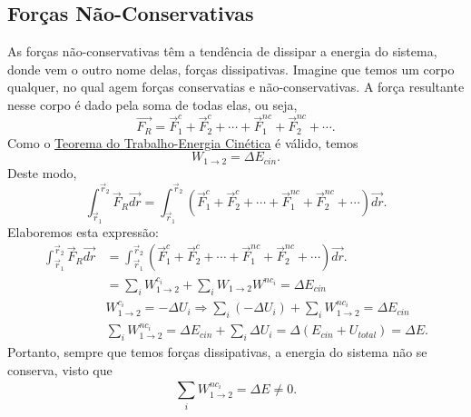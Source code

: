 \documentclass[physics_notes.tex]{subfiles}
\begin{document}
\subsection{Forças Não-Conservativas}
As forças não-conservativas têm a tendência de dissipar a energia do sistema, donde vem o
outro nome delas, forças dissipativas. Imagine que temos um corpo qualquer, no qual
agem forças conservatias e não-conservativas. A força resultante nesse corpo
é dado pela soma de todas elas, ou seja,
\[
	\vec{F_{R}} = \vec{F}_{1}^{c} + \vec{F}_{2}^{c} + \cdots +\vec{F}_{1}^{nc} + \vec{F}_{2}^{nc} + \cdots.
\]
Como o \hyperlink{kin_en_theo}{Teorema do Trabalho-Energia Cinética} é válido, temos
\[
	W_{1\rightarrow2} = \Delta E_{cin}.
\]
Deste modo,
\[
	\int_{\vec{r}_{1}}^{\vec{r}_{2}}\vec{F}_{R}\vec{dr} = \int_{\vec{r}_{1}}^{\vec{r}_{2}}( \vec{F}_{1}^{c} + \vec{F}_{2}^{c} + \cdots +\vec{F}_{1}^{nc} + \vec{F}_{2}^{nc} + \cdots)\vec{dr}.
\]
Elaboremos esta expressão:
\begin{align*}
	\int_{\vec{r}_{1}}^{\vec{r}_{2}}\vec{F}_{R}\vec{dr} & = \int_{\vec{r}_{1}}^{\vec{r}_{2}}( \vec{F}_{1}^{c} + \vec{F}_{2}^{c} + \cdots +\vec{F}_{1}^{nc} + \vec{F}_{2}^{nc} + \cdots)\vec{dr}.                  \\
	                                                    & = \sum\limits_{i}^{}W_{1\rightarrow2}^{c_{i}} + \sum\limits_{i}^{}W_{1\rightarrow2}W^{nc_{i}} = \Delta E_{cin}                                          \\
	                                                    & W_{1\rightarrow2}^{c_{i}} = -\Delta U_{i} \Rightarrow \sum\limits_{i}^{}(-\Delta U_{i}) + \sum\limits_{i}^{}W_{1\rightarrow2}^{nc_{i}} = \Delta E_{cin} \\
	                                                    & \sum\limits_{i}^{}W_{1\rightarrow2}^{nc_{i}}=\Delta E_{cin}+\sum\limits_{i}^{}\Delta U_{i} = \Delta (E_{cin}+U_{total}) = \Delta E.
\end{align*}
Portanto, sempre que temos forças dissipativas, a energia do sistema não se conserva, visto que
\[
	\sum\limits_{i}^{}W_{1\rightarrow2}^{nc_{i}} = \Delta E\neq 0.
\]
\end{document}
